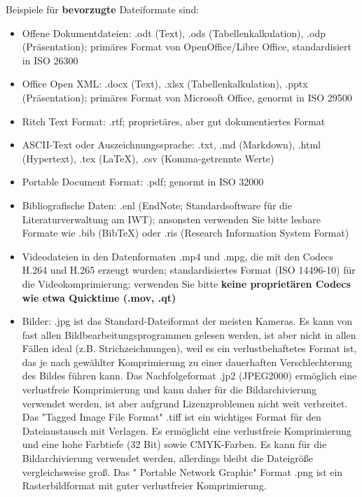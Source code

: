 \noindent Beispiele für \textbf{bevorzugte} Dateiformate sind:
\begin{itemize}
  \item Offene Dokumentdateien: .odt (Text), .ods (Tabellenkalkulation), .odp
        (Präsentation); primäres Format von OpenOffice/Libre Office,
        standardisiert in ISO 26300
  \item Office Open XML: .docx (Text), .xlsx (Tabellenkalkulation), .pptx
        (Präsentation); primäres Format von Microsoft Office, genormt in ISO 29500
  \item Ritch Text Format: .rtf; proprietäres, aber gut dokumentiertes Format
  \item ASCII-Text oder Auszeichnungssprache: .txt, .md (Markdown), .html
        (Hypertext), .tex (LaTeX), .csv (Komma-getrennte Werte)
  \item Portable Document Format: .pdf; genormt in ISO 32000
  \item Bibliografische Daten: .enl (EndNote; Standardsoftware für die
        Literaturverwaltung am IWT); ansonsten verwenden Sie bitte lesbare
        Formate wie .bib (BibTeX) oder .ris (Research Information System Format)
  \item Videodateien in den Datenformaten .mp4 und .mpg, die mit den Codecs
        H.264 und H.265 erzeugt wurden; standardisiertes Format (ISO 14496-10)
        für die Videokomprimierung; verwenden Sie bitte \textbf{keine
        proprietären Codecs wie etwa Quicktime (.mov, .qt)}
  \item Bilder: .jpg ist das Standard-Dateiformat der meisten Kameras. Es kann
        von fast allen Bildbearbeitungsprogrammen gelesen werden, ist aber nicht
        in allen Fällen ideal (z.B. Strichzeichnungen), weil es ein
        verlustbehaftetes Format ist, das je nach gewählter Komprimierung zu
        einer dauerhaften Verschlechterung des Bildes führen kann. Das
        Nachfolgeformat .jp2 (JPEG2000) ermöglich eine verlustfreie
        Komprimierung und kann daher für die Bildarchivierung verwendet werden,
        ist aber aufgrund Lizenzproblemen nicht weit verbreitet. Das
        "Tagged Image File Format" .tiff ist ein wichtiges Format für den
        Dateiaustausch mit Verlagen. Es ermöglicht eine verlustfreie
        Komprimierung und eine hohe Farbtiefe (32 Bit) sowie CMYK-Farben.
        Es kann für die Bildarchivierung verwendet werden, allerdings bleibt die
        Dateigröße vergleichsweise groß. Das " Portable Network Graphic" Format
        .png ist ein Rasterbildformat mit guter verlustfreier Komprimierung.

\end{itemize}
